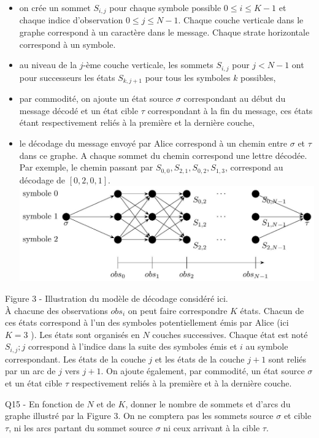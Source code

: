 \documentclass[10pt]{article}
\begin{document}
\begin{itemize}
  \item on crée un sommet $S_{i, j}$ pour chaque symbole possible $0 \leqslant i \leqslant K-1$ et chaque indice d'observation $0 \leqslant j \leqslant N-1$. Chaque couche verticale dans le graphe correspond à un caractère dans le message. Chaque strate horizontale correspond à un symbole.
  \item au niveau de la $j$-ème couche verticale, les sommets $S_{i, j}$ pour $j<N-1$ ont pour successeurs les états $S_{k, j+1}$ pour tous les symboles $k$ possibles,
  \item par commodité, on ajoute un état source $\sigma$ correspondant au début du message décodé et un état cible $\tau$ correspondant à la fin du message, ces états étant respectivement reliés à la première et la dernière couche,
  \item le décodage du message envoyé par Alice correspond à un chemin entre $\sigma$ et $\tau$ dans ce graphe. A chaque sommet du chemin correspond une lettre décodée. Par exemple, le chemin passant par $S_{0,0}, S_{2,1}, S_{0,2}, S_{1,3}$, correspond au décodage de $[0,2,0,1]$.\\
\includegraphics[max width=\textwidth, center]{2025_04_25_b5f58c3e8cc704f29fe4g-10}
\end{itemize}

Figure 3 - Illustration du modèle de décodage considéré ici.\\
À chacune des observations $o b s_{i}$ on peut faire correspondre $K$ états. Chacun de ces états correspond à l'un des symboles potentiellement émis par Alice (ici $K=3$ ). Les états sont organisés en $N$ couches successives. Chaque état est noté $S_{i, j} ; j$ correspond à l'indice dans la suite des symboles émis et $i$ au symbole correspondant. Les états de la couche $j$ et les états de la couche $j+1$ sont reliés par un arc de $j$ vers $j+1$. On ajoute également, par commodité, un état source $\sigma$ et un état cible $\tau$ respectivement reliés à la première et à la dernière couche.

Q15 - En fonction de $N$ et de $K$, donner le nombre de sommets et d'arcs du graphe illustré par la Figure 3. On ne comptera pas les sommets source $\sigma$ et cible $\tau$, ni les arcs partant du sommet source $\sigma$ ni ceux arrivant à la cible $\tau$.
\end{document}
